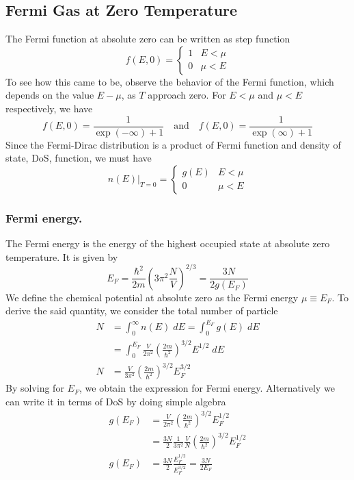 \documentclass[../../../Main.tex]{subfiles}
\begin{document}
\subsection{Fermi Gas at Zero Temperature}
The Fermi function at absolute zero can be written as step function
\begin{equation*}
    f(E,0)=\begin{cases}
        1&E<\mu\\
        0&\mu<E
    \end{cases}
\end{equation*}
To see how this came to be, observe the behavior of the Fermi function, which depends on the value $E-\mu$, as $T$ approach zero. For $E<\mu$ and $\mu<E$ respectively, we have
\begin{equation*}
    f(E,0)=\frac{1}{\exp (-\infty)+1}\quad\text{and}\quad f(E,0)=\frac{1}{\exp(\infty)+1}
\end{equation*}
Since the Fermi-Dirac distribution is a product of Fermi function and density of state, DoS, function, we must have 
\begin{equation*}
    n(E)\big|_{T=0}=\begin{cases}
        g(E)&E<\mu\\
        0&\mu<E
    \end{cases}
\end{equation*}

\subsubsection{Fermi energy.} The Fermi energy is the energy of the highest occupied state at absolute zero temperature.  It is given by
\begin{equation*}
    E_F=\frac{\hbar^2}{2m}\left(3\pi^2\frac{N}{V}\right)^{2/3}=\frac{3N}{2g(E_F)}
\end{equation*}
We define the chemical potential at absolute zero as the Fermi energy  $\mu\equiv E_F$. To derive the said quantity, we consider the total number of particle
\begin{align*}
    N&=\int_{0}^{\infty}n(E)\;dE=\int_{0}^{E_F}g(E)\;dE\\
    &=\int_{0}^{E_F} \frac{V}{2\pi^2}\left(\frac{2m}{\hbar^2}\right)^{3/2}E^{1/2}\;dE\\
    N&=\frac{V}{3\pi^2}\left(\frac{2m}{\hbar^2}\right)^{3/2}E_F^{3/2}
\end{align*}
By solving for $E_F$, we obtain the expression for Fermi energy. Alternatively we can write it in terms of DoS by doing simple algebra
\begin{align*}
    g(E_F)&=\frac{V}{2\pi^2}\left(\frac{2m}{\hbar^2}\right)^{3/2}E_F^{1/2}\\
    &=\frac{3N}{2}\frac{1}{3\pi^2}\frac{V}{N}\left(\frac{2m}{\hbar^2}\right)^{3/2}E_F^{1/2}\\
    g(E_F)&=\frac{3N}{2}\frac{E_F^{1/2}}{E_F^{3/2}}=\frac{3N}{2E_F}
\end{align*}
\end{document}
